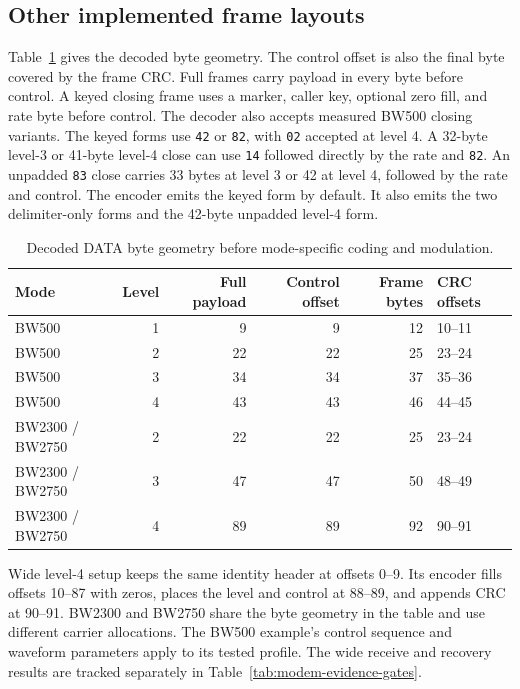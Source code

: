 
\subsection{Other implemented frame layouts}

Table~\ref{tab:worked-mode-widths} gives the decoded byte geometry. The
control offset is also the final byte covered by the frame CRC.
Full frames carry payload in every byte before control. A keyed closing
frame uses a marker, caller key, optional zero fill, and rate byte before
control. The decoder also accepts measured BW500 closing variants.
The keyed forms use \texttt{42} or \texttt{82}, with \texttt{02} accepted
at level 4. A 32-byte level-3 or 41-byte level-4 close can use
\texttt{14} followed directly by the rate and \texttt{82}. An unpadded
\texttt{83} close carries 33 bytes at level 3 or 42 at level 4, followed
by the rate and control. The encoder emits the keyed form by default.
It also emits the two delimiter-only forms and the 42-byte unpadded
level-4 form.

\begin{table}[htbp]
\centering\small
\begin{tabular}{@{}lrrrrl@{}}
\toprule
Mode & Level & Full payload & Control offset & Frame bytes & CRC offsets \\
\midrule
BW500 & 1 & 9 & 9 & 12 & 10--11 \\
BW500 & 2 & 22 & 22 & 25 & 23--24 \\
BW500 & 3 & 34 & 34 & 37 & 35--36 \\
BW500 & 4 & 43 & 43 & 46 & 44--45 \\
BW2300 / BW2750 & 2 & 22 & 22 & 25 & 23--24 \\
BW2300 / BW2750 & 3 & 47 & 47 & 50 & 48--49 \\
BW2300 / BW2750 & 4 & 89 & 89 & 92 & 90--91 \\
\bottomrule
\end{tabular}
\caption{Decoded DATA byte geometry before mode-specific coding and modulation.}
\label{tab:worked-mode-widths}
\end{table}

Wide level-4 setup keeps the same identity header at offsets 0--9. Its
encoder fills offsets 10--87 with zeros, places the level and control at
88--89, and appends CRC at 90--91. BW2300 and BW2750 share the byte
geometry in the table and use different carrier allocations. The BW500
example's control sequence and waveform parameters apply to its tested
profile. The wide receive and recovery results are tracked separately in
Table~\ref{tab:modem-evidence-gates}.
